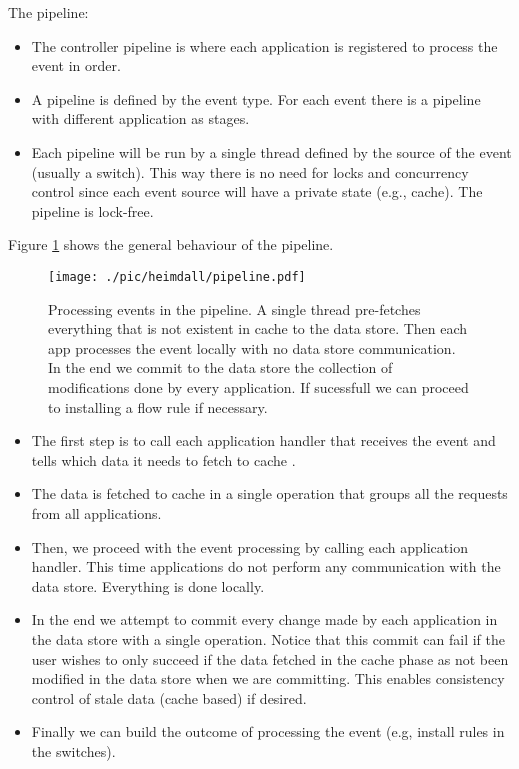 \documentclass[12pt,openright,twoside]{report}
\begin{document}
The pipeline: 
\begin{itemize}
\item The controller pipeline is where each application is registered to process the event in order. 
\item A pipeline is defined by the event type. For each event there is a  pipeline with different application as stages. 
\item Each pipeline will be run by a single thread  defined by the source of the event (usually a switch). This way there is no need for locks and concurrency control since each event source will have a private state (e.g., cache). The pipeline is lock-free. 
\end{itemize}

Figure \ref{fig:pipeline} shows the general behaviour of the pipeline. 


\begin{figure}[ht]
  \centering
  \texttt{[image: ./pic/heimdall/pipeline.pdf]}
  \caption{Processing events in the pipeline. A single thread pre-fetches everything that is not existent in cache to the data store. Then each app processes the event locally with no data store communication. In the end we commit to the data store the collection of modifications done by every application. If sucessfull we can proceed to installing a flow rule if necessary. }
\label{fig:pipeline}
\end{figure}


\begin{itemize}
\item The first step is to call each application handler that receives the event and  tells which data it needs to fetch to cache . 
\item The data is fetched to cache in a single operation that groups all the requests from all applications. 
\item Then, we proceed with the event processing by calling each application handler. This time applications do not perform any communication with the data store. Everything is done locally. 
\item In the end we attempt to commit every change made by each application in the data store with a single operation. Notice that this commit can fail if the user wishes to only succeed if the data fetched in the cache phase as not been modified in the data store when we are committing. This enables consistency control of stale data (cache based) if desired. 
\item Finally we can build the outcome of processing the event (e.g, install rules in the switches). 
\end{itemize}
\end{document}
